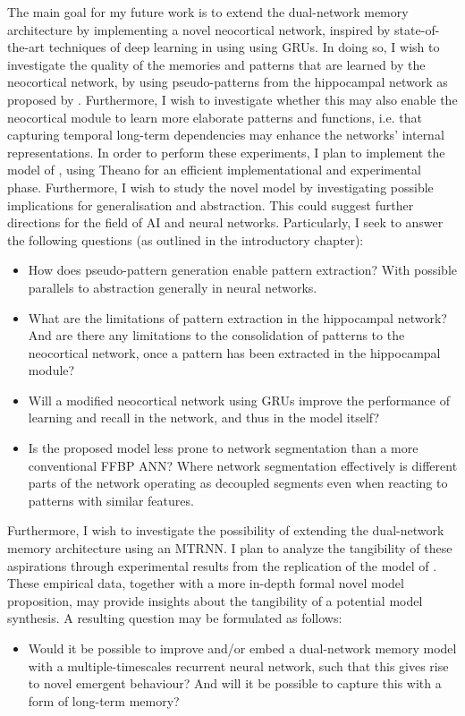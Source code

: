 The main goal for my future work is to extend the dual-network memory architecture by implementing a novel neocortical network, inspired by state-of-the-art techniques of deep learning in using using GRUs. In doing so, I wish to investigate the quality of the memories and patterns that are learned by the neocortical network, by using pseudo-patterns from the hippocampal network as proposed by \cite{Hattori2014}. Furthermore, I wish to investigate whether this may also enable the neocortical module to learn more elaborate patterns and functions, i.e. that capturing temporal long-term dependencies may enhance the networks' internal representations.
In order to perform these experiments, I plan to implement the model of \cite{Hattori2014}, using Theano for an efficient implementational and experimental phase. Furthermore, I wish to study the novel model by investigating possible implications for generalisation and abstraction. This could suggest further directions for the field of AI and neural networks. Particularly, I seek to answer the following questions (as outlined in the introductory chapter):
\begin{itemize}
\item How does pseudo-pattern generation enable pattern extraction? With possible parallels to abstraction generally in neural networks.
\item What are the limitations of pattern extraction in the hippocampal network? And are there any limitations to the consolidation of patterns to the neocortical network, once a pattern has been extracted in the hippocampal module?
\item Will a modified neocortical network using GRUs improve the performance of learning and recall in the network, and thus in the model itself?
\item Is the proposed model less prone to network segmentation than a more conventional FFBP ANN? Where network segmentation effectively is different parts of the network operating as decoupled segments even when reacting to patterns with similar features.
\end{itemize}

Furthermore, I wish to investigate the possibility of extending the dual-network memory architecture using an MTRNN. I plan to analyze the tangibility of these aspirations through experimental results from the replication of the model of \cite{Hattori2014}. These empirical data, together with a more in-depth formal novel model proposition, may provide insights about the tangibility of a potential model synthesis. A resulting question may be formulated as follows:
\begin{itemize}
\item Would it be possible to improve and/or embed a dual-network memory model with a multiple-timescales recurrent neural network, such that this gives rise to novel emergent behaviour? And will it be possible to capture this with a form of long-term memory?
\end{itemize}

